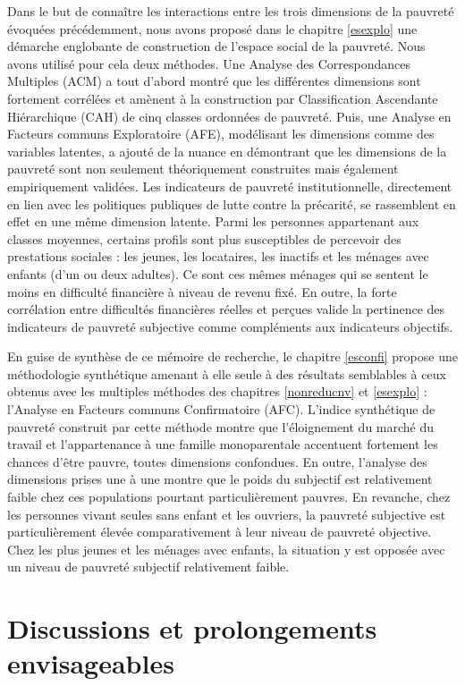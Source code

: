 \documentclass[12pt,a4paper]{reedthesis}
\begin{document}
Dans le but de connaître les interactions entre les trois dimensions de la pauvreté évoquées précédemment, nous avons proposé dans le chapitre \ref{esexplo} une démarche englobante de construction de l'espace social de la pauvreté. Nous avons utilisé pour cela deux méthodes. Une Analyse des Correspondances Multiples (ACM) a tout d'abord montré que les différentes dimensions sont fortement corrélées et amènent à la construction par Classification Ascendante Hiérarchique (CAH) de cinq classes ordonnées de pauvreté. Puis, une Analyse en Facteurs communs Exploratoire (AFE), modélisant les dimensions comme des variables latentes, a ajouté de la nuance en démontrant que les dimensions de la pauvreté sont non seulement théoriquement construites mais également empiriquement validées. Les indicateurs de pauvreté institutionnelle, directement en lien avec les politiques publiques de lutte contre la précarité, se rassemblent en effet en une même dimension latente. Parmi les personnes appartenant aux classes moyennes, certains profils sont plus susceptibles de percevoir des prestations sociales : les jeunes, les locataires, les inactifs et les ménages avec enfants (d'un ou deux adultes). Ce sont ces mêmes ménages qui se sentent le moins en difficulté financière à niveau de revenu fixé. En outre, la forte corrélation entre difficultés financières réelles et perçues valide la pertinence des indicateurs de pauvreté subjective comme compléments aux indicateurs objectifs.

En guise de synthèse de ce mémoire de recherche, le chapitre \ref{esconfi} propose une méthodologie synthétique amenant à elle seule à des résultats semblables à ceux obtenus avec les multiples méthodes des chapitres \ref{nonreducnv} et \ref{esexplo} : l'Analyse en Facteurs communs Confirmatoire (AFC). L'indice synthétique de pauvreté construit par cette méthode montre que l'éloignement du marché du travail et l'appartenance à une famille monoparentale accentuent fortement les chances d'être pauvre, toutes dimensions confondues. En outre, l'analyse des dimensions prises une à une montre que le poids du subjectif est relativement faible chez ces populations pourtant particulièrement pauvres. En revanche, chez les personnes vivant seules sans enfant et les ouvriers, la pauvreté subjective est particulièrement élevée comparativement à leur niveau de pauvreté objective. Chez les plus jeunes et les ménages avec enfants, la situation y est opposée avec un niveau de pauvreté subjectif relativement faible.

\hypertarget{discussions-et-prolongements-envisageables}{%
\section*{Discussions et prolongements envisageables}\label{discussions-et-prolongements-envisageables}}
\end{document}
